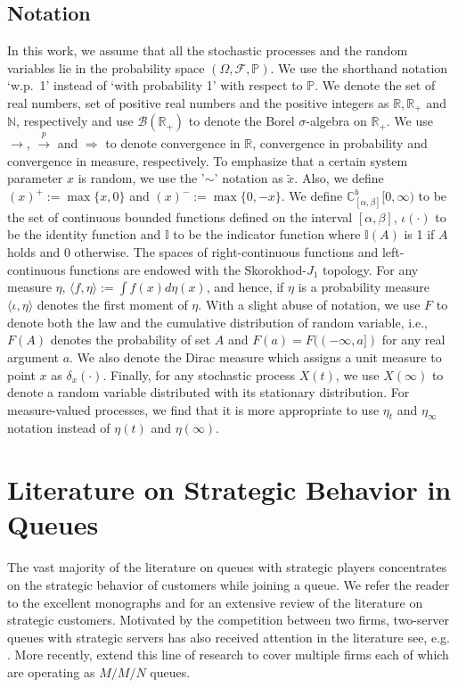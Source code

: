 \documentclass[a4paper,11pt,twoside]{article}
\numberwithin{equation}{section}
\numberwithin{figure}{section}
\theoremstyle{plain}
\newcommand{\cB}{\mathcal{B}}
\newcommand{\cF}{\mathcal{F}}
\newcommand{\CC}{\mathbb{C}}
\newcommand{\II}{\mathbb{I}}
\newcommand{\NN}{\mathbb{N}}
\newcommand{\PP}{\mathbb{P}}
\newcommand{\RR}{\mathbb{R}}
\newcommand{\1}{\mathbbm{1}}
\newcommand{\toP}{\stackrel{p}{\rightarrow}}
\begin{document}
\subsection{Notation}\label{sec:notation}

In this work, we assume that all the stochastic processes and the random variables lie in the probability space $(\Omega, \cF, \PP)$. We use the shorthand notation `w.p.~1' instead of `with probability 1' with respect to $\PP$. We denote the set of real numbers, set of positive real numbers and the positive integers as $\RR, \RR_+$ and $\NN$, respectively and use $\cB(\RR_+)$ to denote the Borel $\sigma$-algebra on $\RR_+$. We use $\to$, $\toP$ and $\Rightarrow$ to denote convergence in $\RR$, convergence  in probability and convergence in measure, respectively. To emphasize that a certain system parameter $x$ is random, we use the '$\sim$' notation as $\tilde{x}$. Also, we define $(x)^{+}:=\max\{x,0\}$ and $(x)^-:=\max\{0,-x\}$. We define $\CC_{[\alpha,\beta]}^b[0,\infty)$ to be the set of continuous bounded functions defined on the interval $[\alpha,\beta]$, $\iota(\cdot)$ to be the identity function and $\II$ to be the indicator function where $\II(A)$ is 1 if $A$ holds and $0$ otherwise. The spaces of right-continuous functions and left-continuous functions are endowed with the Skorokhod-$J_1$ topology. For any measure $\eta$, $\langle f,\eta\rangle:=\int f(x)d\eta(x)$, and hence, if $\eta$ is a probability measure $\langle \iota,\eta\rangle$ denotes the first moment of $\eta$. With a slight abuse of notation, we use $F$ to denote both the law and the cumulative distribution of random variable, i.e., $F(A)$ denotes the probability of set $A$ and $F(a)=F((-\infty, a])$ for any real argument $a$. We also denote the Dirac measure which assigns a unit measure to point $x$ as $\delta_x(\cdot)$. Finally, for any stochastic process $X(t)$, we use $X(\infty)$ to denote a random variable distributed with its stationary distribution. For measure-valued processes, we find that it is more appropriate to use $\eta_t$ and $\eta_\infty$ notation instead of $\eta(t)$ and $\eta(\infty)$.

\section{Literature on Strategic Behavior in Queues}

The vast majority of the literature on queues with strategic players concentrates on the strategic behavior of customers while joining a queue. We refer the reader to the excellent monographs \cite{hassin_haviv_2003} and \cite{hassin_2020} for an extensive review of the literature on strategic customers. Motivated by the competition between two firms, two-server queues with strategic servers has also received attention in the literature see, e.g. \cites{Kalai1992, Gilbert1998, Cachon2002, Cachon2007}. More recently, \cite{Allon2010} extend this line of research to cover multiple firms each of which are operating as $M/M/N$ queues. 
\end{document}

